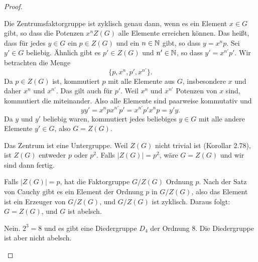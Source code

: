 \begin{proof}
	\begin{parts}
	\item Die Zentrumsfaktorgruppe ist zyklisch genau dann, wenn es ein Element $x\in G$ gibt, so dass die Potenzen $x^nZ(G)$ alle Elemente erreichen können. Das heißt, dass f\"{u}r jedes $y\in G$ ein $p\in Z(G)$ und ein $n\in \mathbb{N}$ gibt, so dass $y=x^np$. Sei $y'\in G$ beliebig. Ähnlich gibt es $p'\in Z(G)$ und $n'\in \mathbb{N}$, so dass $y'=x^{n'}p'$. Wir betrachten die Menge
		\[
			\{p,x^n, p',x^{n'}\} 
		.\] 
		Da $p\in Z(G)$ ist, kommutiert $p$ mit alle Elemente aus $G$, insbesondere $x$ und daher $x^n$ und $x^{n'}$. Das gilt auch f\"{u}r $p'$. Weil $x^n$ und $x^{n'}$ Potenzen von $x$ sind, kommutiert die miteinander. Also alle Elemente sind paarweise kommutativ und
		\[
			yy'=x^n px^{n'}p'=x^{n'}p'x^np=y'y
		.\] 
		Da $y$ und $y'$ beliebig waren, kommutiert jedes beliebiges $y\in G$ mit alle andere Elemente $y' \in G$, also $G=Z(G)$.
	\item Das Zentrum ist eine Untergruppe. Weil $Z(G)$ nicht trivial ist (Korollar 2.78), ist $Z(G)$ entweder $p$ oder $p^2$. Falls $|Z(G)|=p^2$, wäre $G=Z(G)$ und wir sind dann fertig.

		Falls $|Z(G)|=p$, hat die Faktorgruppe $G / Z(G)$ Ordnung $p$. Nach der Satz von Cauchy gibt es ein Element der Ordnung $p$ in $G / Z(G)$, also das Element ist ein Erzeuger von $G / Z(G)$, und $G / Z(G)$ ist zyklisch. Daraus folgt: $G = Z(G)$, und $G$ ist abelsch. 
	\item Nein. $2^3=8$ und es gibt eine Diedergruppe $D_4$ der Ordnung $ 8$. Die Diedergruppe ist aber nicht abelsch.\qedhere
	\end{parts}
\end{proof}
